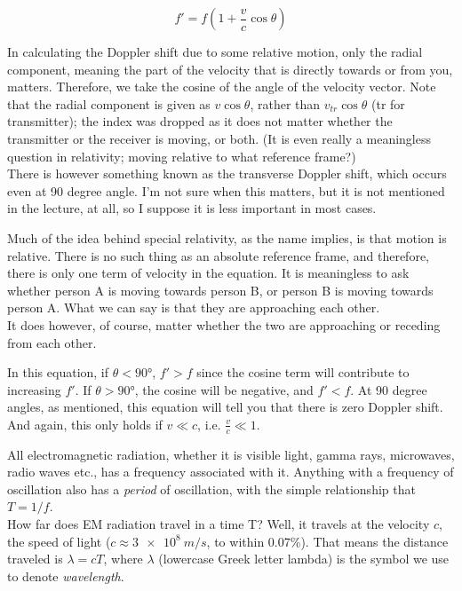 \begin{equation}
f' = f (1 + \frac{v}{c} \cos \theta)
\end{equation}

In calculating the Doppler shift due to some relative motion, only the radial component, meaning the part of the velocity that is directly towards or from you, matters. Therefore, we take the cosine of the angle of the velocity vector. Note that the radial component is given as $v \cos \theta$, rather than $v_{tr} \cos \theta$ (tr for transmitter); the index was dropped as it does not matter whether the transmitter or the receiver is moving, or both. (It is even really a meaningless question in relativity; moving relative to what reference frame?)\\
There is however something known as the transverse Doppler shift, which occurs even at 90 degree angle. I'm not sure when this matters, but it is not mentioned in the lecture, at all, so I suppose it is less important in most cases.

Much of the idea behind special relativity, as the name implies, is that motion is relative. There is no such thing as an absolute reference frame, and therefore, there is only one term of velocity in the equation. It is meaningless to ask whether person A is moving towards person B, or person B is moving towards person A. What we can say is that they are approaching each other.\\
It does however, of course, matter whether the two are approaching or receding from each other.

In this equation, if $\theta < \ang{90}$, $f' > f$ since the cosine term will contribute to increasing $f'$. If $\theta > \ang{90}$, the cosine will be negative, and $f' < f$. At 90 degree angles, as mentioned, this equation will tell you that there is zero Doppler shift. And again, this only holds if $v \ll c$, i.e. $\displaystyle \frac{v}{c} \ll 1$.

All electromagnetic radiation, whether it is visible light, gamma rays, microwaves, radio waves etc., has a frequency associated with it. Anything with a frequency of oscillation also has a \emph{period} of oscillation, with the simple relationship that $T = 1/f$.\\
How far does EM radiation travel in a time T? Well, it travels at the velocity $c$, the speed of light ($c \approx \SI{3e8}{m/s}$, to within 0.07\%). That means the distance traveled is $\lambda = c T$, where $\lambda$ (lowercase Greek letter lambda) is the symbol we use to denote \emph{wavelength}.

